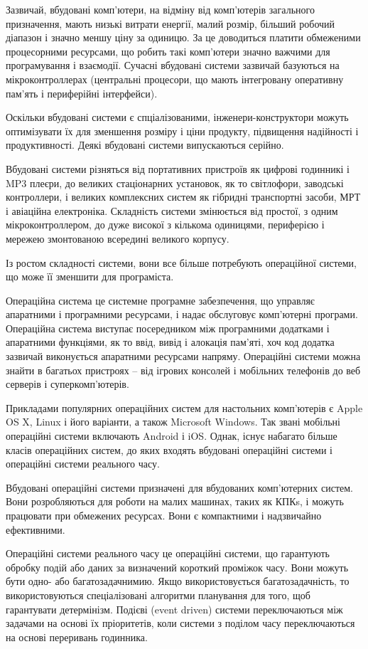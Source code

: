 \documentclass[oneside,14pt,a4paper,final]{myextreport}
\begin{document}
Зазвичай, вбудовані комп'ютери, на відміну від комп'ютерів загального призначення, мають низькі витрати енергії, малий розмір, більший робочий діапазон і значно меншу ціну за одиницю. За це доводиться платити обмеженими процесорними ресурсами, що робить такі комп'ютери значно важчими для програмування і взаємодії. Сучасні вбудовані системи зазвичай базуються на мікроконтроллерах (центральні процесори, що мають інтегровану оперативну пам'ять і периферійні інтерфейси).

Оскільки вбудовані системи є спціалізованими, інженери-конструктори можуть оптимізувати їх для зменшення розміру і ціни продукту, підвищення надійності і продуктивності. Деякі вбудовані системи випускаються серійно.

Вбудовані системи різняться від портативних пристроїв як цифрові годинникі і MP3 плеєри, до великих стаціонарних установок, як то світлофори, заводські контроллери, і великих комплексних систем як гібридні транспортні засоби, МРТ і авіаційна електроніка. Складність системи змінюється від простої, з одним мікроконтроллером, до дуже високої з кількома одиницями, периферією і мережею змонтованою всередині великого корпусу.

Із ростом складності системи, вони все більше потребують операційної системи, що може її зменшити для програміста.

Операційна система це системне програмне забезпечення, що управляє апаратними і програмними ресурсами, і надає обслуговує комп'ютерні програми. Операційна система виступає посередником між програмними додатками і апаратними функціями, як то ввід, вивід і алокація пам'яті, хоч код додатка зазвичай виконується апаратними ресурсами напряму. Операційні системи можна знайти в багатьох пристроях -- від ігрових консолей і мобільних телефонів до веб серверів і суперкомп'ютерів.

Прикладами популярних операційних систем для настольних комп'ютерів є Apple OS X, Linux і його варіанти, а також Microsoft Windows. Так звані мобільні операційні системи включають Android і iOS. Однак, існує набагато більше класів операційних систем, до яких входять вбудовані операційні системи і операційні системи реального часу.

Вбудовані операційні системи призначені для вбудованих комп'ютерних систем. Вони розробляються для роботи на малих машинах, таких як \acp{КПК}, і можуть працювати при обмежених ресурсах. Вони є компактними і надзвичайно ефективними.

Операційні системи реального часу це операційні системи, що гарантують обробку подій або даних за визначений короткий проміжок часу. Вони можуть бути одно- або багатозадачнимию. Якщо використовується багатозадачність, то використовуються спеціалізовані алгоритми планування для того, щоб гарантувати детермінізм. Подієві (event driven) системи переключаються між задачами на основі їх пріоритетів, коли системи з поділом часу переключаються на основі переривань годинника.
\end{document}

